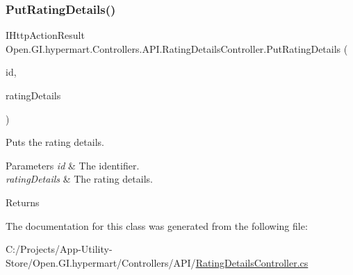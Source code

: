 \subsubsection{\texorpdfstring{Put\+Rating\+Details()}{PutRatingDetails()}}
{\footnotesize\ttfamily I\+Http\+Action\+Result Open.\+G\+I.\+hypermart.\+Controllers.\+A\+P\+I.\+Rating\+Details\+Controller.\+Put\+Rating\+Details (\begin{DoxyParamCaption}\item[{string}]{id,  }\item[{\hyperlink{class_open_1_1_g_i_1_1hypermart_1_1_models_1_1_rating_details}{Rating\+Details}}]{rating\+Details }\end{DoxyParamCaption})}



Puts the rating details. 


\begin{DoxyParams}{Parameters}
{\em id} & The identifier.\\
\hline
{\em rating\+Details} & The rating details.\\
\hline
\end{DoxyParams}
\begin{DoxyReturn}{Returns}

\end{DoxyReturn}


The documentation for this class was generated from the following file\+:\begin{DoxyCompactItemize}
\item 
C\+:/\+Projects/\+App-\/\+Utility-\/\+Store/\+Open.\+G\+I.\+hypermart/\+Controllers/\+A\+P\+I/\hyperlink{_rating_details_controller_8cs}{Rating\+Details\+Controller.\+cs}\end{DoxyCompactItemize}
